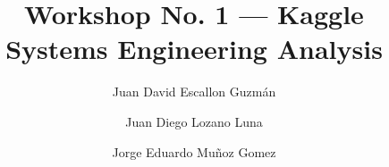 \documentclass[12pt, a4paper]{report}  %
\begin{document}
\title{Workshop No. 1 — Kaggle Systems Engineering Analysis}
\author{Juan David Escallon Guzmán \and Juan Diego Lozano Luna \and Jorge Eduardo Muñoz Gomez}
\maketitle

\tableofcontents
\newpage

 

 

 


\end{document}
